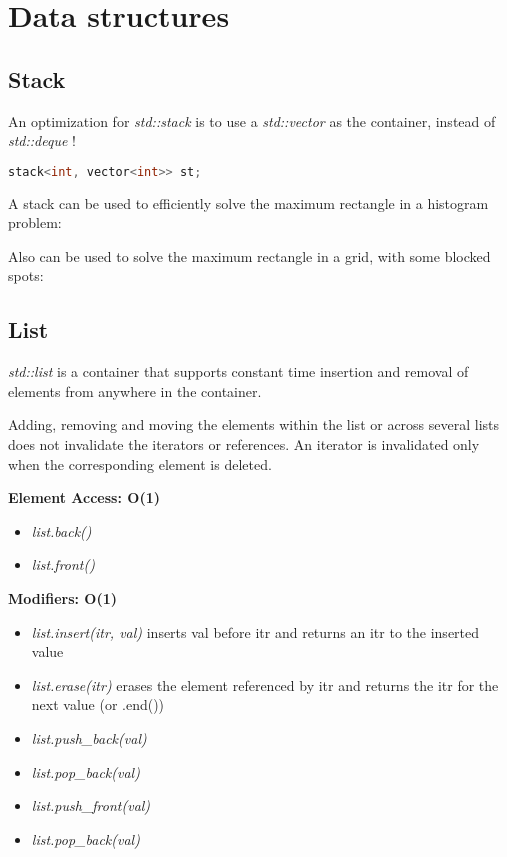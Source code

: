 \chapter{Data structures}

\section{Stack}

    An optimization for \textit{std::stack} is to use a \textit{std::vector} as the container, instead of \textit{std::deque} !

    \begin{lstlisting}[language=c++]
        stack<int, vector<int>> st;
    \end{lstlisting}

    A stack can be used to efficiently solve the maximum rectangle in a histogram problem:


    Also can be used to solve the maximum rectangle in a grid, with some blocked spots:


\section{List}

    \textit{std::list} is a container that supports constant time insertion and removal of elements from anywhere in the container.

    Adding, removing and moving the elements within the list or across several lists does not invalidate the iterators or references.
    An iterator is invalidated only when the corresponding element is deleted.

    \textbf{Element Access: O(1)}

    \begin{itemize}
    \item \textit{list.back()}
    \item \textit{list.front()}
    \end{itemize}

    \textbf{Modifiers: O(1)}

    \begin{itemize}
    \item \textit{list.insert(itr, val)} 
    inserts val before itr and returns an itr to the inserted value

    \item \textit{list.erase(itr)} 
    erases the element referenced by itr and returns the itr for the next value (or .end())

    \item \textit{list.push\_back(val)}
    \item \textit{list.pop\_back(val)}
    \item \textit{list.push\_front(val)}
    \item \textit{list.pop\_back(val)}
    \end{itemize}
    
